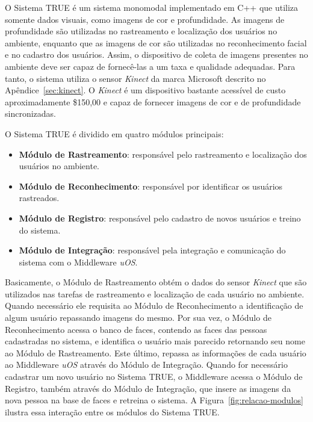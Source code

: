 

O Sistema TRUE é um sistema monomodal implementado em C++ que utiliza somente dados visuais, como imagens de cor e profundidade. As imagens de profundidade são utilizadas no rastreamento e localização dos usuários no ambiente, enquanto que as imagens de cor são utilizadas no reconhecimento facial e no cadastro dos usuários. Assim, o dispositivo de coleta de imagens presentes no ambiente deve ser capaz de fornecê-las a um taxa e qualidade adequadas. Para tanto, o sistema utiliza o sensor \textit{Kinect} da marca Microsoft descrito no Apêndice~\ref{sec:kinect}. O \textit{Kinect} é um dispositivo bastante acessível de custo aproximadamente \$150,00 e capaz de fornecer imagens de cor e de profundidade sincronizadas.

O Sistema TRUE é dividido em quatro módulos principais:

	\begin{itemize}
		\item \textbf{Módulo de Rastreamento}: responsável pelo rastreamento e localização dos usuários no ambiente.
		\item \textbf{Módulo de Reconhecimento}: responsável por identificar os usuários rastreados.
		\item \textbf{Módulo de Registro}: responsável pelo cadastro de novos usuários e treino do sistema.
		\item \textbf{Módulo de Integração}: responsável pela integração e comunicação do sistema com o Middleware \textit{uOS}.
	\end{itemize}

Basicamente, o Módulo de Rastreamento obtém o dados do sensor \textit{Kinect} que são utilizados nas tarefas de rastreamento e localização de cada usuário no ambiente. Quando necessário ele requisita ao Módulo de Reconhecimento a identificação de algum usuário repassando imagens do mesmo. Por sua vez, o Módulo de Reconhecimento acessa o banco de faces, contendo as faces das pessoas cadastradas no sistema, e identifica o usuário mais parecido retornando seu nome ao Módulo de Rastreamento. Este último, repassa as informações de cada usuário ao Middleware \textit{uOS} através do Módulo de Integração. Quando for necessário cadastrar um novo usuário no Sistema TRUE, o Middleware acessa o Módulo de Registro, também através do Módulo de Integração, que insere as imagens da nova pessoa na base de faces e retreina o sistema. A Figura~\ref{fig:relacao-modulos} ilustra essa interação entre os módulos do Sistema TRUE.

